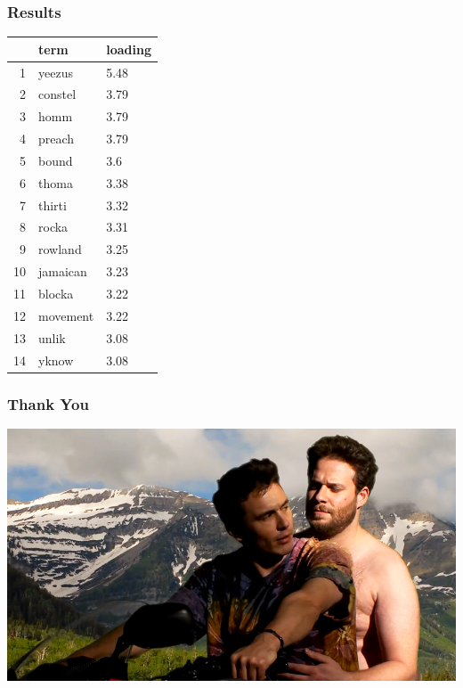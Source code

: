 \documentclass[handout]{beamer}
\begin{document}
\begin{frame}
\frametitle{Results}
\pause
\begin{table}[ht]
\centering
\begin{tabular}{rll}
  \hline
 & term & loading \\ 
  \hline
1 & yeezus & 5.48 \\ 
  2 & constel & 3.79 \\ 
  3 & homm & 3.79 \\ 
  4 & preach & 3.79 \\ 
  5 & bound & 3.6 \\ 
  6 & thoma & 3.38 \\ 
  7 & thirti & 3.32 \\ 
  8 & rocka & 3.31 \\ 
  9 & rowland & 3.25 \\ 
  10 & jamaican & 3.23 \\ 
  11 & blocka & 3.22 \\ 
  12 & movement & 3.22 \\ 
  13 & unlik & 3.08 \\ 
  14 & yknow & 3.08 \\ 
   \hline
\end{tabular}
\end{table}
\end{frame}



\begin{frame}
\frametitle{Thank You}
\pause
\begin{center}
\includegraphics[height=1.0\textheight]{Images/rogen.jpg}
\end{center}
\end{frame}
\end{document}
